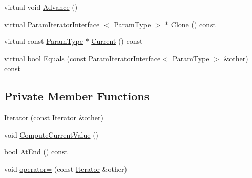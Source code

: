 \begin{DoxyCompactItemize}
\item 
virtual void \hyperlink{classtesting_1_1internal_1_1CartesianProductGenerator6_1_1Iterator_aaa5a890708f89affa1a7726cf152c872}{\-Advance} ()
\item 
virtual \hyperlink{classtesting_1_1internal_1_1ParamIteratorInterface}{\-Param\-Iterator\-Interface}\*
$<$ \hyperlink{classtesting_1_1internal_1_1CartesianProductGenerator6_a2f46503012c4ef785ad3fe03defbc7e1}{\-Param\-Type} $>$ $\ast$ \hyperlink{classtesting_1_1internal_1_1CartesianProductGenerator6_1_1Iterator_a4bee4982ee1152c6935ffd0c2d749421}{\-Clone} () const 
\item 
virtual const \hyperlink{classtesting_1_1internal_1_1CartesianProductGenerator6_a2f46503012c4ef785ad3fe03defbc7e1}{\-Param\-Type} $\ast$ \hyperlink{classtesting_1_1internal_1_1CartesianProductGenerator6_1_1Iterator_ab27aeab5db14a30f077a37989ce9261c}{\-Current} () const 
\item 
virtual bool \hyperlink{classtesting_1_1internal_1_1CartesianProductGenerator6_1_1Iterator_a8f18f9a017a12730cce28c07460bbc14}{\-Equals} (const \hyperlink{classtesting_1_1internal_1_1ParamIteratorInterface}{\-Param\-Iterator\-Interface}$<$ \hyperlink{classtesting_1_1internal_1_1CartesianProductGenerator6_a2f46503012c4ef785ad3fe03defbc7e1}{\-Param\-Type} $>$ \&other) const 
\end{DoxyCompactItemize}
\subsection*{\-Private \-Member \-Functions}
\begin{DoxyCompactItemize}
\item 
\hyperlink{classtesting_1_1internal_1_1CartesianProductGenerator6_1_1Iterator_a2b76c2e597bc9393f2b99e869e4fa8d2}{\-Iterator} (const \hyperlink{classtesting_1_1internal_1_1CartesianProductGenerator6_1_1Iterator}{\-Iterator} \&other)
\item 
void \hyperlink{classtesting_1_1internal_1_1CartesianProductGenerator6_1_1Iterator_a4c18cbbef042bab72ed484f5b6923908}{\-Compute\-Current\-Value} ()
\item 
bool \hyperlink{classtesting_1_1internal_1_1CartesianProductGenerator6_1_1Iterator_a6eb9b47ffa4b10f0dca403fc597faba0}{\-At\-End} () const 
\item 
void \hyperlink{classtesting_1_1internal_1_1CartesianProductGenerator6_1_1Iterator_ac087d740f6aa05ec07afd0c5c0327105}{operator=} (const \hyperlink{classtesting_1_1internal_1_1CartesianProductGenerator6_1_1Iterator}{\-Iterator} \&other)
\end{DoxyCompactItemize}
